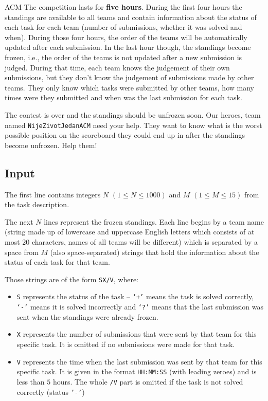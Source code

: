 \begin{statement}[
  problempoints=50,
  timelimit=1 second,
  memorylimit=512 MiB,
]{ACM}
The competition lasts for \textbf{five hours}. During the first four hours the
standings are available to all teams and contain information about the status of
each task for each team (number of submissions, whether it was solved and when).
During those four hours, the order of the teams will be automatically updated
after each submission. In the last hour though, the standings become frozen, i.e.,
the order of the teams is not updated after a new submission is judged. During
that time, each team knows the judgement of their own submissions, but they
don't know the judgement of submissions made by other teams. They only know which
tasks were submitted by other teams, how many times were they submitted and when
was the last submission for each task.

The contest is over and the standings should be unfrozen soon. Our heroes, team
named \texttt{NijeZivotJedanACM} need your help. They want to know what is the
worst possible position on the scoreboard they could end up in after the standings
become unfrozen. Help them!

\subsection*{Input}
The first line contains integers $N$ $(1 \le N \le 1000)$ and $M$ $(1 \le M \le 15)$
from the task description.

The next $N$ lines represent the frozen standings. Each line begins by a team
name (string made up of lowercase and uppercase English letters which consists
of at most $20$ characters, names of all teams will be different) which is
separated by a space from $M$ (also space-separated) strings that hold
the information about the status of each task for that team.

Those strings are of the form \texttt{SX/V}, where:
\begin{itemize}[topsep=0pt]
  \item \texttt{S} represents the status of the task -- \texttt{‘+’} means the
    task is solved correctly, \texttt{‘-’} means it is solved incorrectly and
    \texttt{‘?’} means that the last submission was sent when the standings were
    already frozen.
  \item \texttt{X} represents the number of submissions that were sent by that
        team for this specific task. It is omitted if no submissions were made
        for that task.
  \item \texttt{V} represents the time when the last submission was sent by
        that team for this specific task. It is given in the format
        \texttt{HH:MM:SS} (with leading zeroes) and is less than $5$ hours.
    The whole \texttt{/V} part is omitted if the task is not solved correctly
    (status \texttt{'-'})
\end{itemize}


\end{statement}
